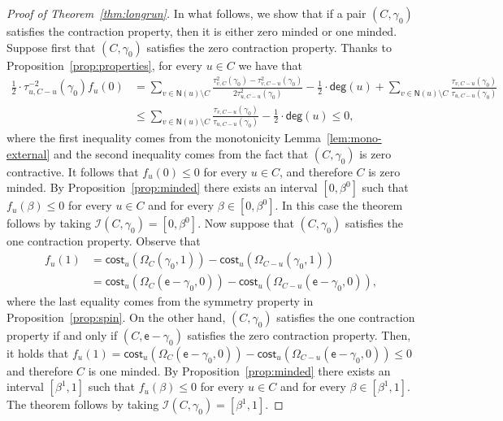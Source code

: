 \documentclass[letterpaper,11pt]{article}
\newcommand{\nsf}{\mathsf{N}}
\newcommand{\cost}{\mathsf{cost}}
\newcommand{\degsf}{\mathsf{deg}}
\newcommand{\vvcom}[1]{\todo[color=red!25!white]{Victor: #1}}
\begin{document}
\begin{proof}[Proof of Theorem~\ref{thm:longrun}]
\vvcom{arreglar esto}
In what follows, we show that if a pair $(C,\gamma_0)$ satisfies the contraction property, then it is either zero minded or one minded. 
Suppose first that $(C,\gamma_0)$ satisfies the zero contraction property. 
Thanks to Proposition~\ref{prop:properties}, for every $u\in C$ we have that
\begin{align*}
\frac{1}{2}\cdot \tau^{-2}_{u,C-u}(\gamma_0)f_u(0)&=\sum_{v\in \nsf(u)\setminus C}\frac{\tau^2_{v,C}(\gamma_0)-\tau^2_{v,C-u}(\gamma_0)}{2\tau^2_{u,C-u}(\gamma_0)}-\frac{1}{2}\cdot \degsf(u) + \sum_{v\in \nsf(u)\setminus C}\frac{\tau_{v,C-u}(\gamma_0)}{\tau_{u,C-u}(\gamma_0)}\\
&\le \sum_{v\in \nsf(u)\setminus C}\frac{\tau_{v,C-u}(\gamma_0)}{\tau_{u,C-u}(\gamma_0)}-\frac{1}{2}\cdot \degsf(u)\le 0,
\end{align*}
where the first inequality comes from the monotonicity Lemma~\ref{lem:mono-external} and the second inequality comes from the fact that $(C,\gamma_0)$ is zero contractive.
It follows that $f_u(0)\le 0$ for every $u\in C$, and therefore $C$ is zero minded. 
By Proposition~\ref{prop:minded} there exists an interval $[0,\beta^0]$ such that $f_u(\beta)\le 0$ for every $u\in C$ and for every $\beta\in [0,\beta^0]$. 
In this case the theorem follows by taking $\mathcal{I}(C,\gamma_0)=[0,\beta^0]$.
Now suppose that $(C,\gamma_0)$ satisfies the one contraction property. 
Observe that 
\begin{align*}
f_u(1)&=\cost_u(\Omega_C(\gamma_0,1))-\cost_u(\Omega_{C-u}(\gamma_0,1))\\
&=\cost_u(\Omega_C(\mathsf{e}-\gamma_0,0))-\cost_u(\Omega_{C-u}(\mathsf{e}-\gamma_0,0)),
\end{align*}
where the last equality comes from the symmetry property in Proposition~\ref{prop:spin}.
On the other hand, $(C,\gamma_0)$ satisfies the one contraction property if and only if $(C,\mathsf{e}-\gamma_0)$ satisfies the zero contraction property. 
Then, it holds that $f_u(1)=\cost_u(\Omega_C(\mathsf{e}-\gamma_0,0))-\cost_u(\Omega_{C-u}(\mathsf{e}-\gamma_0,0))\le 0$ and therefore $C$ is one minded. 
By Proposition~\ref{prop:minded} there exists an interval $[\beta^1,1]$ such that $f_u(\beta)\le 0$ for every $u\in C$ and for every $\beta\in [\beta^1,1]$. 
The theorem follows by taking $\mathcal{I}(C,\gamma_0)=[\beta^1,1]$.
\end{proof}
\end{document}
